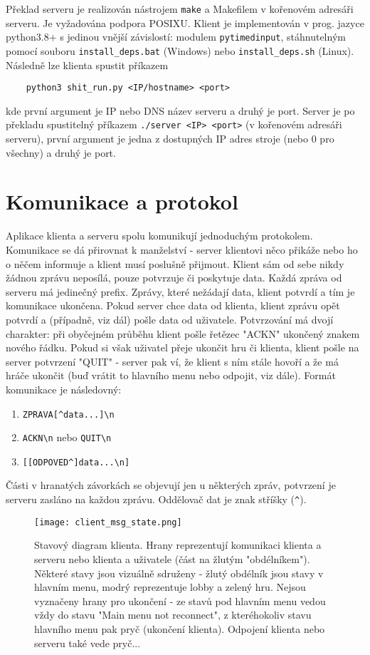 \documentclass{article}
\begin{document}
Překlad serveru je realizován nástrojem \verb|make| a Makefilem v kořenovém adresáři serveru. Je vyžadována podpora POSIXU. Klient je implementován v prog. jazyce python3.8+ s jedinou vnější závislostí: modulem \verb|pytimedinput|, stáhnutelným pomocí souboru \verb|install_deps.bat| (Windows) nebo \verb|install_deps.sh| (Linux). Následně lze klienta spustit příkazem 
\begin{verbatim}
    python3 shit_run.py <IP/hostname> <port>
\end{verbatim}
kde první argument je IP nebo DNS název serveru a druhý je port. Server je po překladu spustitelný příkazem \verb|./server <IP> <port>| (v kořenovém adresáři serveru), první argument je jedna z dostupných IP adres stroje (nebo 0 pro všechny) a druhý je port.

\section{Komunikace a protokol}

Aplikace klienta a serveru spolu komunikují jednoduchým  protokolem. Komunikace se dá přirovnat k manželství - server klientovi něco přikáže nebo ho o něčem informuje a klient musí poslušně přijmout. Klient sám od sebe nikdy žádnou zprávu neposílá, pouze potvrzuje či poskytuje data. Každá zpráva od serveru má jedinečný prefix. Zprávy, které nežádají data, klient potvrdí a tím je komunikace ukončena. Pokud server chce data od klienta, klient zprávu opět potvrdí a (případně, viz dál) pošle data od uživatele. Potvrzování má dvojí charakter: při obyčejném průběhu klient pošle řetězec "ACKN" ukončený znakem nového řádku. Pokud si však uživatel přeje ukončit hru či klienta, klient pošle na server potvrzení "QUIT" - server pak ví, že klient s ním stále hovoří a že má hráče ukončit (buď vrátit to hlavního menu nebo odpojit, viz dále). Formát komunikace je následovný:

\begin{enumerate}
    \item \verb-ZPRAVA[^data...]\n-
    \item \verb-ACKN\n- nebo \verb-QUIT\n-
    \item \verb-[[ODPOVED^]data...\n]-
\end{enumerate}
Části v hranatých závorkách se objevují jen u některých zpráv, potvrzení je serveru zasláno na každou zprávu. Oddělovač dat je znak stříšky (\verb-^-).

\begin{figure}
    \centering
    \texttt{[image: client\_msg\_state.png]}
    \caption{Stavový diagram klienta. Hrany reprezentují komunikaci klienta a serveru nebo klienta a uživatele (část na žlutým "obdélníkem"). Některé stavy jsou vizuálně sdruženy - žlutý obdélník jsou stavy v hlavním menu, modrý reprezentuje lobby a zelený hru. Nejsou vyznačeny hrany pro ukončení - ze stavů pod hlavním menu vedou vždy do stavu "Main menu not reconnect", z kteréhokoliv stavu hlavního menu pak pryč (ukončení klienta). Odpojení klienta nebo serveru také vede pryč... }
    \label{fig:client-states}
\end{figure}
\end{document}
